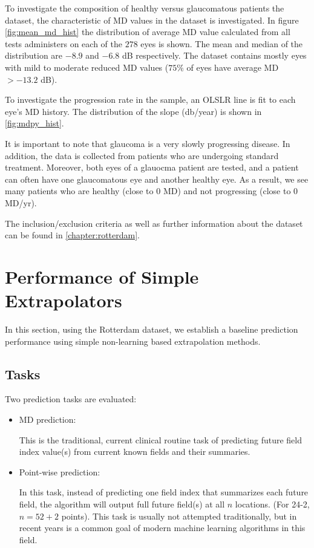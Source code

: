 To investigate the composition of healthy versus glaucomatous patients the dataset, the characteristic of \ac{MD} values in the dataset is investigated. In figure \ref{fig:mean_md_hist} the distribution of average \ac{MD} value calculated from all tests administers on each of the $278$ eyes is shown. The mean and median of the distribution are $-8.9$ and $-6.8$ dB respectively. The dataset contains mostly eyes with mild to moderate reduced MD values ($75\%$ of eyes have average MD $>-13.2$ dB).

To investigate the progression rate in the sample, an \ac{OLSLR} line is fit to each eye's \ac{MD} history. The distribution of the slope (db/year) is shown in \cref{fig:mdpy_hist}. 

It is important to note that glaucoma is a very slowly progressing disease. In addition, the data is collected from patients who are undergoing standard treatment. Moreover, both eyes of a glauocma patient are tested, and a patient can often have one glaucomatous eye and another healthy eye. As a result, we see many patients who are healthy (close to $0$ MD) and not progressing (close to $0$ MD/yr).

The inclusion/exclusion criteria as well as further information about the dataset can be found in \cref{chapter:rotterdam}.

\section{Performance of Simple Extrapolators}

In this section, using the Rotterdam dataset, we establish a baseline prediction performance using simple non-learning based extrapolation methods. 

\subsection{Tasks}

Two prediction tasks are evaluated:

\begin{itemize}
	\item \ac{MD} prediction:
	
	This is the traditional, current clinical routine task of predicting future field index value(s) from current known fields and their summaries. 
	
	\item Point-wise prediction:
	
	In this task, instead of predicting one field index that summarizes each future field, the algorithm will output full future field(s) at all $n$ locations. (For 24-2, $n=52+2$ points). This task is usually not attempted traditionally, but in recent years is a common goal of modern machine learning algorithms in this field.
	
\end{itemize}

